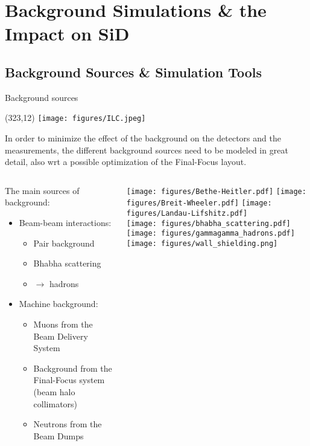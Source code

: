 \documentclass[xcolor={dvipsnames}]{beamer}
\newcommand{\ilclogo}{
  \setlength{\TPHorizModule}{1pt}
  \setlength{\TPVertModule}{1pt}
  \begin{textblock}{1}(323,12)
   \texttt{[image: figures/ILC.jpeg]}
  \end{textblock}
}
\begin{document}

\section{Background Simulations \& the Impact on SiD}

\subsection{Background Sources \& Simulation Tools}
\begin{frame}{Background sources}
\ilclogo
\begin{block}{}
In order to minimize the effect of the background on the detectors and the measurements, the different background sources need to be modeled in great detail, also wrt a possible optimization of the Final-Focus layout.
\end{block}
\begin{columns}
 \begin{column}{0.65\textwidth}
 The main sources of background:
  \begin{itemize}
    \item Beam-beam interactions:
    \begin{itemize}
      \item Pair background
      \item Bhabha scattering
      \item \textgamma \textgamma $\rightarrow$ hadrons
    \end{itemize}
    \vspace*{0.3cm}
    \item Machine background:
    \begin{itemize}
      \item Muons from the Beam Delivery System
      \item Background from the Final-Focus system (beam halo collimators)
      \item Neutrons from the Beam Dumps
    \end{itemize}
  \end{itemize}
 \end{column}
 \begin{column}{0.4\textwidth}
 \begin{center}
 \texttt{[image: figures/Bethe-Heitler.pdf]}
 \texttt{[image: figures/Breit-Wheeler.pdf]}
 \texttt{[image: figures/Landau-Lifshitz.pdf]}\\
 \texttt{[image: figures/bhabha\_scattering.pdf]} 
 \texttt{[image: figures/gammagamma\_hadrons.pdf]}\\
 \vspace*{0.3cm}
 \texttt{[image: figures/wall\_shielding.png]}  
 \end{center}
 \end{column}
\end{columns}
\end{frame}
\end{document}
